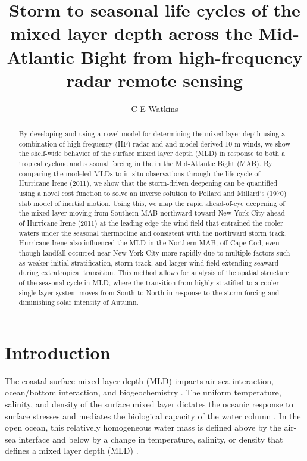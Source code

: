 \documentclass{article}
\title{Storm to seasonal life cycles of the mixed layer depth across the Mid-Atlantic Bight from high-frequency radar remote sensing}
\author[1]{C E Watkins}
\affil[1]{Department of Marine and Coastal Sciences, Rutgers, New Brunswick, NJ, USA}
\begin{document}
\maketitle
 
\begin{abstract}
By developing and using a novel model for determining the mixed-layer depth using a combination of high-frequency (HF) radar and and model-derived 10-m winds, we show the shelf-wide behavior of the surface mixed layer depth (MLD) in response to both a tropical cyclone and seasonal forcing in the in the Mid-Atlantic Bight (MAB). 
By comparing the modeled MLDs to in-situ observations through the life cycle of Hurricane Irene (2011), we show that the storm-driven deepening can be quantified using a novel cost function to solve an inverse solution to Pollard and Millard’s (1970) slab model of inertial motion.
Using this, we map the rapid ahead-of-eye deepening of the mixed layer moving from Southern MAB northward toward New York City ahead of Hurricane Irene (2011) at the leading edge the wind field that entrained the cooler waters under the seasonal thermocline and consistent with the northward storm track.
Hurricane Irene also influenced the MLD in the Northern MAB, off Cape Cod, even though landfall occurred near New York City more rapidly due to multiple factors such as weaker initial stratification, storm track, and larger wind field extending seaward during extratropical transition.
This method allows for analysis of the spatial structure of the seasonal cycle in MLD, where the transition from highly stratified to a cooler single-layer system moves from South to North in response to the storm-forcing and diminishing solar intensity of Autumn.
\end{abstract}

\doublespacing
\section*{Introduction}
The coastal surface mixed layer depth (MLD) impacts air-sea interaction, ocean/bottom interaction, and biogeochemistry \cite{Kraus1967,ambler2013seasonal,chen2018seasonal}.
The uniform temperature, salinity, and density of the surface mixed layer dictates the oceanic response to surface stresses and mediates the biological capacity of the water column \cite{Carvalho2017}.
In the open ocean, this relatively homogeneous water mass is defined above by the air-sea interface and below by a change in temperature, salinity, or density that defines a mixed layer depth (MLD) \cite{Thomson2003,Jeronimo2010}.
\end{document}
